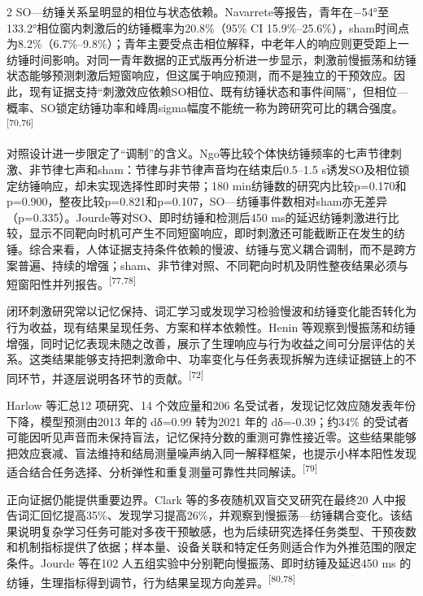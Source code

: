 \documentclass[UTF8,zihao=5,fontset=none]{ctexart}
\newcommand{\hei}{\CJKfamily{hei}}
\newcommand{\leveltwo}[1]{%
  \par\vspace{6pt}\noindent{\hei\fontsize{10pt}{16pt}\selectfont\bfseries #1\par}\vspace{2pt}}
\newcommand{\refcite}[1]{\nolinebreak[4]\textsuperscript{[#1]}}
\begin{document}
\begin{multicols}{2}
SO—纺锤关系呈明显的相位与状态依赖。Navarrete等报告，青年在−54°至133.2°相位窗内刺激后的纺锤概率为20.8\%（95\% CI 15.9\%--25.6\%），sham时间点为8.2\%（6.7\%--9.8\%）；青年主要受点击相位解释，中老年人的响应则更受距上一纺锤时间影响。对同一青年数据的正式版再分析进一步显示，刺激前慢振荡和纺锤状态能够预测刺激后短窗响应，但这属于响应预测，而不是独立的干预效应。因此，现有证据支持“刺激效应依赖SO相位、既有纺锤状态和事件间隔”，但相位—概率、SO锁定纺锤功率和峰周sigma幅度不能统一称为跨研究可比的耦合强度。\refcite{70,76}\par

对照设计进一步限定了“调制”的含义。Ngo等比较个体快纺锤频率的七声节律刺激、非节律七声和sham：节律与非节律声音均在结束后0.5--1.5 s诱发SO及相位锁定纺锤响应，却未实现选择性即时夹带；180 min纺锤数的研究内比较p=0.170和p=0.900，整夜比较p=0.821和p=0.107，SO—纺锤事件数相对sham亦无差异（p=0.335）。Jourde等对SO、即时纺锤和检测后450 ms的延迟纺锤刺激进行比较，显示不同靶向时机可产生不同短窗响应，即时刺激还可能截断正在发生的纺锤。综合来看，人体证据支持条件依赖的慢波、纺锤与宽义耦合调制，而不是跨方案普遍、持续的增强；sham、非节律对照、不同靶向时机及阴性整夜结果必须与短窗阳性并列报告。\refcite{77,78}\par

\leveltwo{3.3 记忆巩固与认知收益的疗效证据及争议}

闭环刺激研究常以记忆保持、词汇学习或发现学习检验慢波和纺锤变化能否转化为行为收益，现有结果呈现任务、方案和样本依赖性。Henin 等观察到慢振荡和纺锤增强，同时记忆表现未随之改善，展示了生理响应与行为收益之间可分层评估的关系。这类结果能够支持把刺激命中、功率变化与任务表现拆解为连续证据链上的不同环节，并逐层说明各环节的贡献。\refcite{72}\par

Harlow 等汇总12 项研究、14 个效应量和206 名受试者，发现记忆效应随发表年份下降，模型预测由2013 年的 dδ=0.99 转为2021 年的 dδ=-0.39；约34\% 的受试者可能因听见声音而未保持盲法，记忆保持分数的重测可靠性接近零。这些结果能够把效应衰减、盲法维持和结局测量噪声纳入同一解释框架，也提示小样本阳性发现适合结合任务选择、分析弹性和重复测量可靠性共同解读。\refcite{79}\par

正向证据仍能提供重要边界。Clark 等的多夜随机双盲交叉研究在最终20 人中报告词汇回忆提高35\%、发现学习提高26\%，并观察到慢振荡—纺锤耦合变化。该结果说明复杂学习任务可能对多夜干预敏感，也为后续研究选择任务类型、干预夜数和机制指标提供了依据；样本量、设备关联和特定任务则适合作为外推范围的限定条件。Jourde 等在102 人五组实验中分别靶向慢振荡、即时纺锤及延迟450 ms 的纺锤，生理指标得到调节，行为结果呈现方向差异。\refcite{80,78}\par


\end{multicols}
\end{document}
